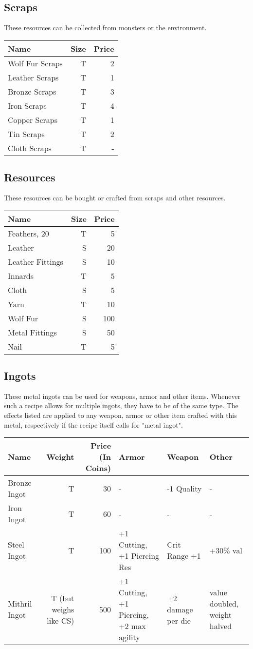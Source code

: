 \subsection{Scraps}\label{subsec:scraps}
These resources can be collected from monsters or the environment.
\begin{longtable}{l | r | r }
	Name & Size & Price\\ \hline
	Wolf Fur Scraps & T & 2\\
	Leather Scraps & T & 1\\
	Bronze Scraps & T & 3\\
	Iron Scraps & T & 4\\
	Copper Scraps & T & 1\\
	Tin Scraps & T & 2\\
	Cloth Scraps & T & -\\
\end{longtable}

\subsection{Resources}\label{subsec:resources}
These resources can be bought or crafted from scraps and other resources.
\begin{longtable}{l | r | r }
	Name & Size & Price\\ \hline
	Feathers, 20 & T & 5\\
	Leather & S & 20\\
	Leather Fittings & S & 10\\
	Innards & T & 5\\
	Cloth & S & 5\\
	Yarn & T & 10\\
	Wolf Fur & S & 100\\
	Metal Fittings & S & 50\\
	Nail & T & 5\\
\end{longtable}

\subsection{Ingots}\label{subsec:ingots}
These metal ingots can be used for weapons, armor and other items.
Whenever such a recipe allows for multiple ingots, they have to be of the same type.
The effects listed are applied to any weapon, armor or other item crafted with this metal, respectively if the recipe itself calls for "metal ingot".
\begin{longtable}{l | r | r | p{2cm} | p{2cm} | p{2cm}}
	Name & Weight & Price (In Coins) & Armor & Weapon & Other\\ \hline
	Bronze Ingot & T & 30 & - & -1 Quality & -\\
	Iron Ingot & T & 60 & - & - & -\\
	Steel Ingot & T & 100 & +1 Cutting, +1 Piercing Res & Crit Range +1 & +30\% val\\
	Mithril  Ingot & T (but weighs like CS) & 500 & +1 Cutting, +1 Piercing, +2 max agility & +2 damage per die & value doubled, weight halved\\
\end{longtable}

